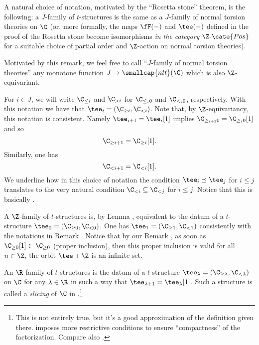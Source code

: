 \begin{remark}
A natural choice of notation, motivated by the ``Rosetta stone'' theorem, is the following: a $J$-family of $t$-structures is the same as a $J$-family of normal torsion theories on $\C$ (or, more formally, the maps $\fF(-)$ and $\tee(-)$ defined in the proof of the Rosetta stone become isomorphisms \emph{in the category $\Z\text{-}\cate{Pos}$} for a suitable choice of partial order and $\Z$-action on normal torsion theories).

Motivated by this remark, we feel free to call ``$J$-family of normal torsion theories'' any monotone function $J\to \smallcap{ntt}(\C)$ which is also $\Z$-equivariant.
\end{remark}
\begin{notat}\label{magictrick}
For $i\in J$, we will write $\C_{\leq i}$ and $\C_{>i}$ for $\C_{\leq_i0}$ and $\C_{<_i0}$, respectively. With this notation we have that $\tee_i=(\C_{\geq i},\C_{<i})$. Note that, by $\Z $-equivariancy, this notation is consistent. Namely $\tee_{i+1}=\tee_i[1]$ implies $\C_{\geq_{i+1}0}=\C_{\geq_i0}[1]$ and so
\[
\C_{\geq i+1}=\C_{\geq i}[1].
\]
Similarly, one has
\[
\C_{< i+1}=\C_{< i}[1].
\]
We underline how in this choice of notation the condition $\tee_i\preceq \tee_j$ for $i\leq j$ translates to the very natural condition $\C_{<i}\subseteq \C_{<j}$ for $i\leq j$. Notice that this is basically \cite[\adef \textbf{3.1}]{GKR}.
\end{notat}
\begin{example}
A $\Z $-family of $t$-structures is, by Lemma , equivalent to the datum of a $t$-structure $\tee_0=(\C_{\geq 0},\C_{<0})$. One has $\tee_1=(\C_{\geq 1},\C_{<1})$ consistently with the notations in Remark . Notice that by our Remark , as soon as $\C_{\ge 0}[1]\subset \C_{\ge 0}$ (proper inclusion), then this proper inclusion is valid for all $n\in\Z$, \ie the orbit $\tee + \Z$ is an infinite set.
\end{example}
\begin{example}\label{what.s.slici}
An $\R$-family of $t$-structures is the datum of a $t$-structure $\tee_\lambda=(\C_{\geq \lambda},\C_{<\lambda})$ on $\C$ for any $\lambda\in \R$ in such a way that $\tee_{\lambda+1}=\tee_\lambda[1]$. Such a structure is called a \emph{slicing} of $\C$ in \cite{Brid}.\footnote{This is not entirely true, but it's a good approximation of the definition given there. \cite{Brid} imposes more restrictive conditions to ensure ``compactness'' of the factorization. Compare also \cite{GKR}.} 
\end{example}

